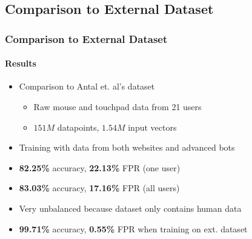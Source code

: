 \documentclass[t,aspectratio=169,table]{beamer}
\begin{document}
\subsection{Comparison to External Dataset}
\begin{frame}
\frametitle{Comparison to External Dataset}
\framesubtitle{Results}

\begin{itemize}
    \item Comparison to Antal et. al's dataset \cite{9111596}
    \begin{itemize}
        \item Raw mouse and touchpad data from 21 users
        \item $151M$ datapoints, $1.54M$ input vectors
    \end{itemize}
    \item Training with data from both websites and advanced bots
    \item \textbf{82.25\%} accuracy, \textbf{22.13\%} FPR (one user)
    \item \textbf{83.03\%} accuracy, \textbf{17.16\%} FPR (all users)
    \item Very unbalanced because dataset only contains human data
    \item \textbf{99.71\%} accuracy, \textbf{0.55\%} FPR when training on ext. dataset
\end{itemize}

\end{frame}
\end{document}
